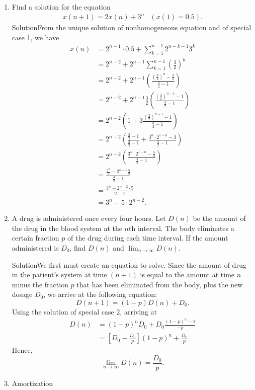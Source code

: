 \begin{enumerate}
    \item Find a solution for the equation
        \begin{align*}
            x(n+1)=2x(n)+3^n & \left(x(1)=0.5\right).
        \end{align*}
        Solution\quad From the unique solution of nonhomogeneous equation and of special case 1, we have
        \begin{align*}
            x(n) & =2^{n-1}\cdot0.5+\sum_{k=1}^{n-1}2^{n-k-1}3^k \\
                 & =2^{n-2}+2^{n-1}\sum_{k=1}^{n-1}(\frac{3}{2})^k \\
                 & =2^{n-2}+2^{n-1}\left(\frac{(\frac{3}{2})^n-\frac{3}{2}}{\frac{3}{2}-1}\right) \\
                 & =2^{n-2}+2^{n-1}\frac{3}{2}\left(\frac{(\frac{3}{2})^{n-1}-1}{\frac{3}{2}-1}\right) \\
                 & =2^{n-2}\left(1+3\frac{(\frac{3}{2})^{n-1}-1}{\frac{3}{2}-1}\right) \\
                 & =2^{n-2}\left(\frac{\frac{3}{2}-1}{\frac{3}{2}-1}+\frac{3^n\cdot 2^{1-n}-3}{\frac{3}{2}-1}\right) \\
                 & =2^{n-2}\left(\frac{3^n\cdot 2^{1-n}-\frac{5}{2}}{\frac{3}{2}-1}\right) \\
                 & =\frac{\frac{3^n}{2}-2^{n-2}\frac{5}{2}}{\frac{3}{2}-1} \\
                 & =\frac{3^n-2^{n-2}\cdot 5}{2-1} \\
                 & = 3^n-5\cdot 2^{n-2}.
        \end{align*}
    \item A drug is administered once every four hours. Let $D(n)$ be the amount of the drug in the blood system at the $n$th interval. The body eliminates a certain fraction $p$ of the drug during each time interval. If the amount administered is $D_0$, find $D(n)$ and $\lim_{n\to\infty} D(n)$.

        Solution\quad We first must create an equation to solve. Since the amount of drug in the patient's system at time $(n+1)$ is equal to the amount at time $n$ minus the fraction $p$ that has been eliminated from the body, plus the new dosage $D_0$, we arrive at the following equation:
        \[D(n+1)=(1-p)D(n)+D_0.\]
        Using the solution of special case 2, arriving at
        \begin{align*}
            D(n) & =(1-p)^nD_0+D_0\frac{(1-p)^n-1}{-p} \\
                 & =\left[D_0-\frac{D_0}{p}\right](1-p)^n+\frac{D_0}{p}
        \end{align*}
        Hence,
        \[\lim\limits_{n\to\infty} D(n)=\frac{D_0}{p}.\]
    \item Amortization


\end{enumerate}
